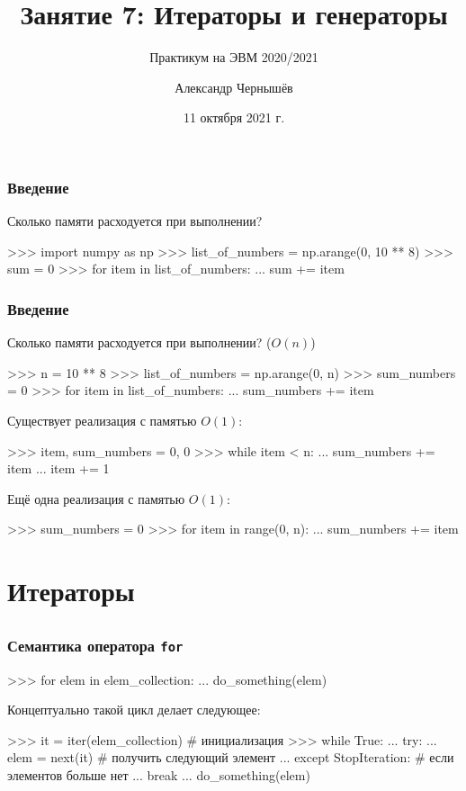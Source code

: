 \documentclass[fleqn, xcolor=x11names]{beamer}
\title[Введение в Python]{\bfseries Занятие 7: Итераторы и генераторы}
\author[Чернышёв~А.\,В.]{Александр Чернышёв}
\subtitle{Практикум на ЭВМ 2020/2021}
\institute[ВМК МГУ]{МГУ имени М. В. Ломоносова, факультет ВМК, кафедра ММП}
\date{11 октября 2021 г.}
\begin{document}
\begin{frame}
\maketitle
\end{frame} 

\begin{frame}[fragile]\frametitle{Введение}

Сколько памяти расходуется при выполнении?

\begin{pcode}
>>> import numpy as np
>>> list_of_numbers = np.arange(0, 10 ** 8)
>>> sum = 0
>>> for item in list_of_numbers: 
...     sum += item
\end{pcode}

\end{frame} 

\begin{frame}[fragile]\frametitle{Введение}

Сколько памяти расходуется при выполнении? ($O(n)$)

\begin{pcode}
>>> n = 10 ** 8
>>> list_of_numbers = np.arange(0, n)
>>> sum_numbers = 0
>>> for item in list_of_numbers: 
...     sum_numbers += item
\end{pcode}


Существует реализация с памятью $O(1)$:

\begin{pcode}
>>> item, sum_numbers = 0, 0
>>> while item < n:
...     sum_numbers += item
...     item += 1
\end{pcode}

Ещё одна реализация с памятью $O(1)$:
\begin{pcode}
>>> sum_numbers = 0
>>> for item in range(0, n): 
...     sum_numbers += item
\end{pcode}


\end{frame} 


\section{Итераторы}
\subsection*{}

\begin{frame}[fragile]\frametitle{Семантика оператора \texttt{for}}
\begin{pcode}
>>> for elem in elem_collection:
...     do_something(elem)
\end{pcode}

\hfill

Концептуально такой цикл  делает следующее:
\begin{pcode}
>>> it = iter(elem_collection) # инициализация  
>>> while True:
...     try:
...         elem = next(it) # получить следующий элемент
...     except StopIteration: # если элементов больше нет
...         break
...     do_something(elem)
\end{pcode}
\end{frame}
\end{document}
